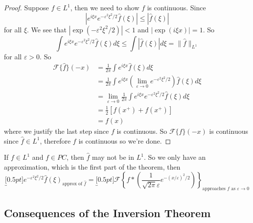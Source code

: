 \begin{proof}
Suppose $f\in L^{1}$, then we need to show $f$ is
continuous. Since
\begin{equation}
|e^{i\xi x}e^{-\varepsilon^2\xi^2/2}\widehat{f}(\xi)|\leq|\widehat{f}(\xi)|
\end{equation}
for all $\xi$. We see that $|\exp(-\varepsilon^2\xi^2/2)|<1$
and $|\exp(i\xi x)|=1$. So
\begin{equation}
\int e^{i\xi
  x}e^{-\varepsilon^2\xi^2/2}\widehat{f}(\xi)d\xi\leq
\int|\widehat{f}(\xi)|d\xi = \|\widehat{f}\|_{L^1}
\end{equation}
for all $\varepsilon>0$. So
\begin{align*}
\mathcal{F}\{\widehat{f}\}(-x) &= \frac{1}{2\pi}\int e^{i\xi x}\widehat{f}(\xi)d\xi\\
&=\frac{1}{2\pi}\int e^{i\xi x}\left(\lim_{\varepsilon\to0}e^{-\varepsilon^2\xi^2/2}\right)\widehat{f}(\xi)d\xi\\
&=\lim_{\varepsilon\to0}\frac{1}{2\pi}\int e^{i\xi x}e^{-\varepsilon^2\xi^2/2}\widehat{f}(\xi)d\xi\\
&=\frac{1}{2}[f(x^+)+f(x^+)]\\
&= f(x)
\end{align*}
where we justify the last step since $f$ is continuous. So
$\mathcal{F}\{\widehat{f}\}(-x)$ is continuous since
$\widehat{f}\in L^1$, therefore $f$ is continuous so we're done.
\end{proof}

\begin{rmk}
If $f\in L^{1}$ and $f\in PC$, then $\widehat{f}$ may not be
in $L^1$. So we only have an approximation, which is the
first part of the theorem, then
\begin{equation*}
\underbracket[0.5pt]{e^{-\varepsilon^2\xi^2/2}\widehat{f}(\xi)}_{\text{approx
    of }\widehat{f}}=\underbracket[0.5pt]{\mathcal{F}\left\{f*\left(\frac{1}{\sqrt{2\pi}\varepsilon}e^{-(x/\varepsilon)^2/2}\right)\right\}}_{\text{approaches $f$ as $\varepsilon\to0$}}
\end{equation*}
\end{rmk}

\subsection{Consequences of the Inversion Theorem}

